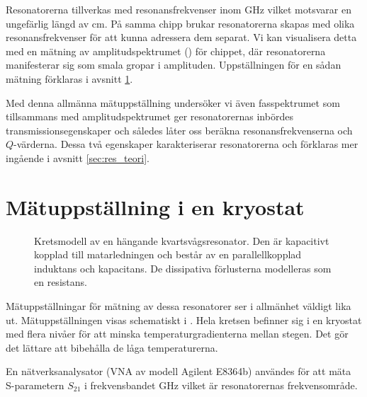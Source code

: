 \documentclass[main.tex]{subfiles}
\begin{document}
Resonatorerna tillverkas med resonansfrekvenser inom \unit[4-8]{GHz} vilket motsvarar en ungefärlig längd av \unit[1-2]{cm}. På samma chipp brukar resonatorerna skapas med olika resonansfrekvenser för att kunna adressera dem separat. Vi kan visualisera detta med en mätning av amplitudspektrumet () för chippet, där resonatorerna manifesterar sig som smala gropar i amplituden. Uppställningen för en sådan mätning förklaras i avsnitt \ref{sec:matuppstallning}.


Med denna allmänna mätuppställning undersöker vi även fasspektrumet som tillsammans med amplitudspektrumet ger resonatorernas inbördes transmissionsegenskaper och således låter oss beräkna resonansfrekvenserna och $Q$-värderna. Dessa två egenskaper karakteriserar resonatorerna och förklaras mer ingående i avsnitt \ref{sec:res_teori}.

\newpage
\section{Mätuppställning i en kryostat}
\label{sec:matuppstallning}


\begin{figure}
    \centering
    \begin{circuitikz}[line width=1pt,scale=0.65]
        
    \end{circuitikz}
    \caption{Kretsmodell av en hängande kvartsvågsresonator. Den är kapacitivt kopplad till matarledningen och består av en parallellkopplad induktans och kapacitans. De dissipativa förlusterna modelleras som en resistans.}
    \label{fig:ekviv_krets}
\end{figure}


Mätuppställningar för mätning av dessa resonatorer ser i allmänhet väldigt lika ut. Mätuppställningen visas schematiskt i . Hela kretsen befinner sig i en kryostat med flera nivåer för att minska temperaturgradienterna mellan stegen. Det gör det lättare att bibehålla de låga temperaturerna.

En nätverksanalysator (VNA av modell Agilent E8364b) användes för att mäta S-parametern $S_{21}$ i frekvensbandet \unit[4-8]{GHz} vilket är resonatorernas frekvensområde.
\end{document}
